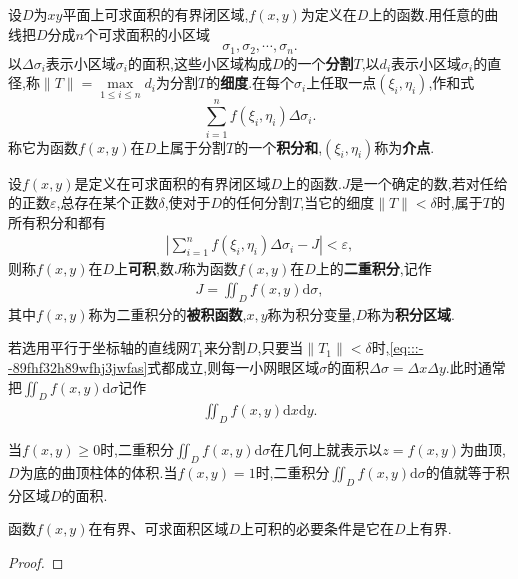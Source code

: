 \documentclass[../../main.tex]{subfiles}%
\begin{document}
\begin{definition}
设$D$为$xy$平面上可求面积的有界闭区域,$f(x,y)$为定义在$D$上的函数.用任意的曲线把$D$分成$n$个可求面积的小区域
\[
\sigma_1,\sigma_2,\cdots,\sigma_n.
\]
以$\Delta \sigma_i$表示小区域$\sigma_i$的面积,这些小区域构成$D$的一个\textbf{分割}$T$,以$d_i$表示小区域$\sigma_i$的直径,称$\| T \| = \max\limits_{1 \leqslant i \leqslant n} d_i$为分割$T$的\textbf{细度}.在每个$\sigma_i$上任取一点$(\xi_i,\eta_i)$,作和式
\[
\sum_{i=1}^n f(\xi_i,\eta_i)\Delta \sigma_i.
\]
称它为函数$f(x,y)$在$D$上属于分割$T$的一个\textbf{积分和},$(\xi_i,\eta_i)$称为\textbf{介点}.
\end{definition}

\begin{definition}
设$f(x,y)$是定义在可求面积的有界闭区域$D$上的函数.$J$是一个确定的数,若对任给的正数$\varepsilon$,总存在某个正数$\delta$,使对于$D$的任何分割$T$,当它的细度$\| T \| < \delta$时,属于$T$的所有积分和都有
\begin{align}
\left| \sum_{i=1}^n f(\xi_i,\eta_i)\Delta \sigma_i - J \right| < \varepsilon, \label{eq:::--89fhf32h89wfhj3jwfas}
\end{align}
则称$f(x,y)$在$D$上\textbf{可积},数$J$称为函数$f(x,y)$在$D$上的\textbf{二重积分},记作
\begin{align*}
J = \iint_D f(x,y)\mathrm{d}\sigma, 
\end{align*}
其中$f(x,y)$称为二重积分的\textbf{被积函数},$x,y$称为积分变量,$D$称为\textbf{积分区域}.

若选用平行于坐标轴的直线网$T_1$来分割$D$,只要当$\| T_1 \| < \delta$时,\eqref{eq:::--89fhf32h89wfhj3jwfas}式都成立,则每一小网眼区域$\sigma$的面积$\Delta \sigma = \Delta x \Delta y$.此时通常把$\iint_D f(x,y)\mathrm{d}\sigma$记作
\begin{align*}
\iint_D f(x,y)\mathrm{d}x\mathrm{d}y. 
\end{align*}
\end{definition}
\begin{remark}
当$f(x,y) \geqslant 0$时,二重积分$\iint_D f(x,y)\mathrm{d}\sigma$在几何上就表示以$z=f(x,y)$为曲顶,$D$为底的曲顶柱体的体积.当$f(x,y)=1$时,二重积分$\iint_D f(x,y)\mathrm{d}\sigma$的值就等于积分区域$D$的面积.
\end{remark}

\begin{theorem}
函数$f(x,y)$在有界、可求面积区域$D$上可积的必要条件是它在$D$上有界.
\end{theorem}
\begin{proof}



\end{proof}
\end{document}
